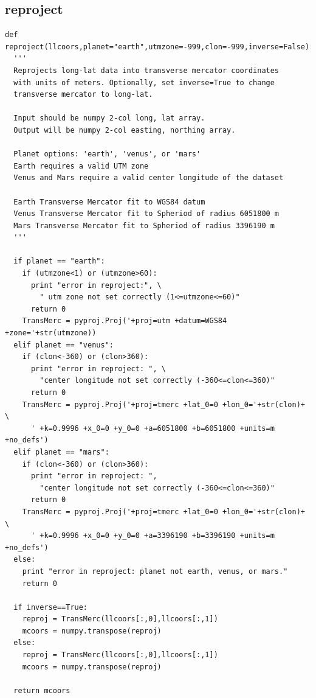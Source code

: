 \documentclass[12pt,letter]{article}
\begin{document}
\subsection{reproject}
\begin{verbatim}
def reproject(llcoors,planet="earth",utmzone=-999,clon=-999,inverse=False):
  '''
  Reprojects long-lat data into transverse mercator coordinates
  with units of meters. Optionally, set inverse=True to change
  transverse mercator to long-lat.
  
  Input should be numpy 2-col long, lat array.
  Output will be numpy 2-col easting, northing array.  
  
  Planet options: 'earth', 'venus', or 'mars'
  Earth requires a valid UTM zone
  Venus and Mars require a valid center longitude of the dataset
  
  Earth Transverse Mercator fit to WGS84 datum
  Venus Transverse Mercator fit to Spheriod of radius 6051800 m
  Mars Transverse Mercator fit to Spheriod of radius 3396190 m
  '''
  
  if planet == "earth":
    if (utmzone<1) or (utmzone>60):
      print "error in reproject:", \
        " utm zone not set correctly (1<=utmzone<=60)"
      return 0
    TransMerc = pyproj.Proj('+proj=utm +datum=WGS84 +zone='+str(utmzone))
  elif planet == "venus":
    if (clon<-360) or (clon>360):
      print "error in reproject: ", \
        "center longitude not set correctly (-360<=clon<=360)"
      return 0
    TransMerc = pyproj.Proj('+proj=tmerc +lat_0=0 +lon_0='+str(clon)+ \ 
      ' +k=0.9996 +x_0=0 +y_0=0 +a=6051800 +b=6051800 +units=m +no_defs')
  elif planet == "mars":
    if (clon<-360) or (clon>360):
      print "error in reproject: ",
        "center longitude not set correctly (-360<=clon<=360)"
      return 0
    TransMerc = pyproj.Proj('+proj=tmerc +lat_0=0 +lon_0='+str(clon)+ \
      ' +k=0.9996 +x_0=0 +y_0=0 +a=3396190 +b=3396190 +units=m +no_defs')
  else:
    print "error in reproject: planet not earth, venus, or mars."
    return 0
  
  if inverse==True:
    reproj = TransMerc(llcoors[:,0],llcoors[:,1])
    mcoors = numpy.transpose(reproj)
  else:
    reproj = TransMerc(llcoors[:,0],llcoors[:,1])
    mcoors = numpy.transpose(reproj)
  
  return mcoors
\end{verbatim}
\end{document}
